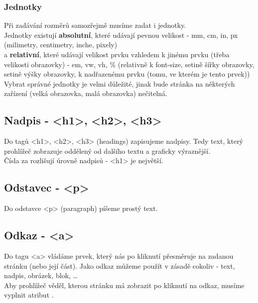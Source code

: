 \subsubsection{Jednotky}
Při zadávání rozměrů samozřejmě musíme zadat i jednotky.\\
Jednotky existují \textbf{absolutní}, které udávají pevnou velikost - mm, cm, in, px (milimetry, centimetry, inche, pixely)\\
a \textbf{relativní}, které udávají velikost prvku vzhledem k jinému prvku (třeba velikosti obrazovky) - em, vw, vh, \% (relativně k font-size, setině šířky obrazovky, setině výšky obrazovky, k nadřazenému prvku (tomu, ve kterém je tento prvek))\\
\vspace{0.5cm}
Vybrat správné jednotky je velmi důležité, jinak bude stránka na některých zařízení (velká obrazovka, malá obrazovka) nečitelná.

\subsection{Nadpis - <h1>, <h2>, <h3>}
Do tagů <h1>, <h2>, <h3> (headings) zapisujeme nadpisy. Tedy text, který prohlížeč zobrazuje oddělený od dalšího textu a graficky výraznější.\\
Čísla za  rozlišují úrovně nadpisů - <h1> je největší.

\subsection{Odstavec - <p>}
Do odstavce <p> (paragraph) píšeme prostý text.

\subsection{Odkaz - <a>}
Do tagu <a> vládáme prvek, který nás po kliknutí přesměruje na zadanou stránku (nebo její část). Jako odkaz můžeme použít v zásadě cokoliv - text, nadpis, obrázek, blok, \dots \\
Aby prohlížeč věděl, kterou stránku má zobrazit po kliknutí na odkaz, musíme vyplnit atribut .

